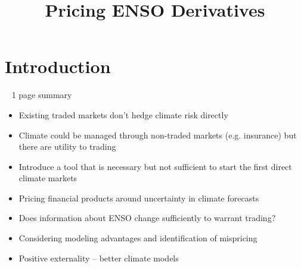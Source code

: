 \documentclass[authoryear]{article}
\begin{document}
\title{Pricing ENSO Derivatives}
\date{}  %
%
%
%
%
%


\maketitle%


\section{Introduction}



~ 1 page summary

\begin{itemize}
\item Existing traded markets don't hedge climate risk directly
\item Climate could be managed through non-traded markets (e.g. insurance) but there are utility to trading
\end{itemize}

\begin{itemize}
\item Introduce a tool that is necessary but not sufficient to start the first direct climate markets
\item Pricing financial products around uncertainty in climate forecasts
\item Does information about ENSO change sufficiently to warrant trading?
\item Considering modeling advantages and identification of mispricing
\item Positive externality – better climate models
\end{itemize}
\end{document}
